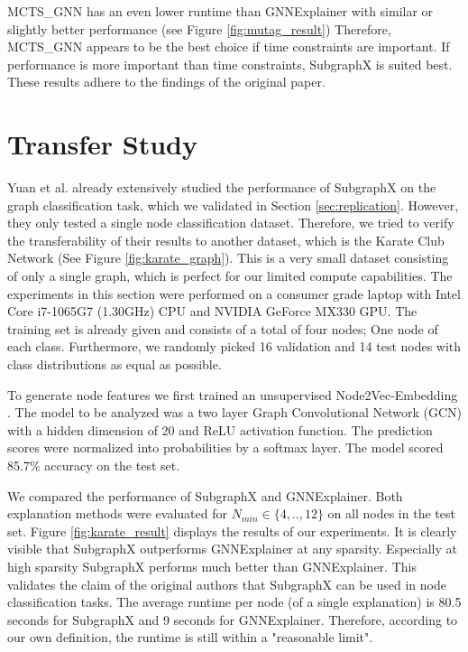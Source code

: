 MCTS\_GNN has an even lower runtime than GNNExplainer with similar or slightly better performance (see Figure \ref{fig:mutag_result})
Therefore, MCTS\_GNN appears to be the best choice if time constraints are important. 
If performance is more important than time constraints, SubgraphX is suited best. 
These results adhere to the findings of the original paper.



\section{Transfer Study}

Yuan et al. \cite{Yuan21} already extensively studied the performance of SubgraphX on the graph classification task, which we validated in Section \ref{sec:replication}. 
However, they only tested a single node classification dataset.
Therefore, we tried to verify the transferability of their results to another dataset, which is the Karate Club Network \cite{Zachary77} (See Figure \ref{fig:karate_graph}).
This is a very small dataset consisting of only a single graph, which is perfect for our limited compute capabilities.
The experiments in this section were performed on a consumer grade laptop with Intel Core i7-1065G7 (1.30GHz) CPU and NVIDIA GeForce MX330 GPU.
The training set is already given and consists of a total of four nodes; One node of each class. 
Furthermore, we randomly picked 16 validation and 14 test nodes with class distributions as equal as possible. 

To generate node features we first trained an unsupervised Node2Vec-Embedding \cite{grover16}. 
The model to be analyzed was a two layer Graph Convolutional Network (GCN) \cite{kipf17} with a hidden dimension of 20 and ReLU activation function. 
The prediction scores were normalized into probabilities by a softmax layer. 
The model scored 85.7\% accuracy on the test set. 

We compared the performance of SubgraphX and GNNExplainer. 
Both explanation methods were evaluated for $N_{min}\in \{4,..,12\}$ on all nodes in the test set.
Figure \ref{fig:karate_result} displays the results of our experiments.
It is clearly visible that SubgraphX outperforms GNNExplainer at any sparsity.
Especially at high sparsity SubgraphX performs much better than GNNExplainer. 
This validates the claim of the original authors that SubgraphX can be used in node classification tasks.
The average runtime per node (of a single explanation) is 80.5 seconds for SubgraphX and 9 seconds for GNNExplainer. 
Therefore, according to our own definition, the runtime is still within a "reasonable limit".

